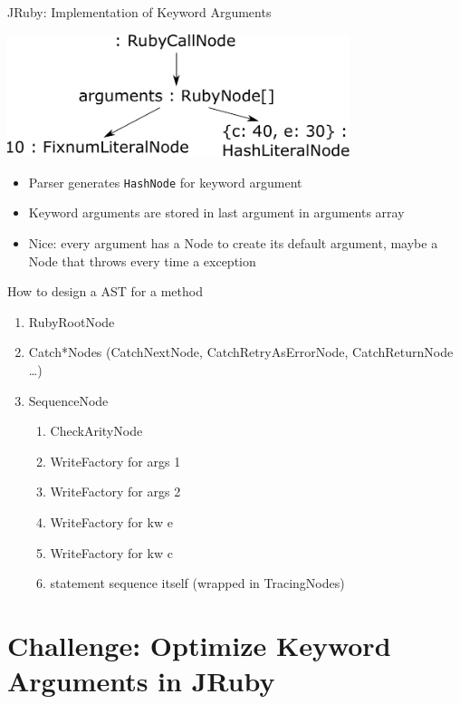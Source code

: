 \documentclass[xcolor=dvipsname,handout]{beamer} %
\begin{document}
\begin{frame}{JRuby: Implementation of Keyword Arguments}
\begin{table}
    \centering
    \includegraphics[width=0.75\textwidth]{kwarg_1.pdf}
\end{table}

\begin{itemize}
    \item Parser generates \lstinline{HashNode} for keyword argument
    \item Keyword arguments are stored in last argument in arguments array
    \item Nice: every argument has a Node to create its default argument, maybe a Node that throws every time a exception
\end{itemize}
\end{frame}
\begin{frame}{How to design a AST for a method}
\begin{enumerate}
 \item RubyRootNode
 \item Catch*Nodes (CatchNextNode, CatchRetryAsErrorNode, CatchReturnNode \dots)
 \item SequenceNode \begin{enumerate}
    \item CheckArityNode
    \item WriteFactory for args 1
    \item WriteFactory for args 2
    \item WriteFactory for kw e
    \item WriteFactory for kw c
    \item statement sequence itself (wrapped in TracingNodes)
  \end{enumerate}
\end{enumerate}
\end{frame}



\section{Challenge: Optimize Keyword Arguments in JRuby}
\end{document}

